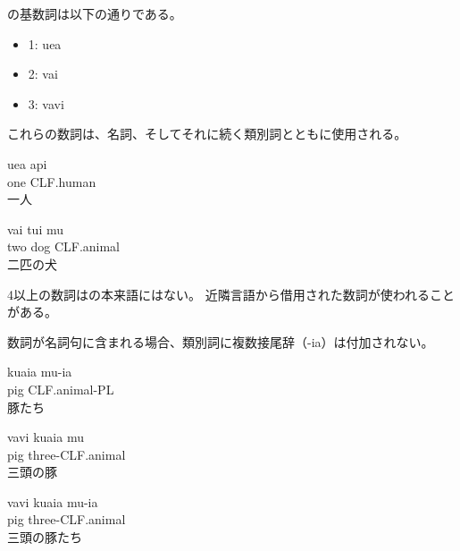 \langname の基数詞は以下の通りである。
\begin{itemize}
    \item 1: uea
    \item 2: vai
    \item 3: vavi
\end{itemize}

これらの数詞は、名詞、そしてそれに続く類別詞とともに使用される。
\begin{exe}
    \ex \gll uea api \\
    one CLF.human \\
    \glt 一人
\end{exe}
\begin{exe}
    \ex \gll vai tui mu \\
    two dog CLF.animal \\
    \glt 二匹の犬
\end{exe}

4以上の数詞は\langname の本来語にはない。
近隣言語から借用された数詞が使われることがある。


数詞が名詞句に含まれる場合、類別詞に複数接尾辞（-ia）は付加されない。
\begin{exe}
    \ex \gll kuaia mu-ia \\
    pig CLF.animal-PL \\
    \glt 豚たち
\end{exe}
\begin{exe}
    \ex \gll vavi kuaia mu \\
    pig three-CLF.animal \\
    \glt 三頭の豚
\end{exe}
\begin{exe}
    \ex \gll *vavi kuaia mu-ia \\
    pig three-CLF.animal \\
    \glt 三頭の豚たち
\end{exe}